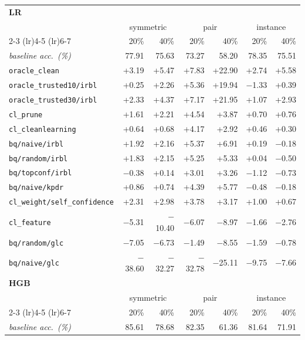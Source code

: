 \begin{tabular}{lrrrrrr}
\toprule
\multicolumn{7}{l}{\textbf{LR}} \\
 & \multicolumn{2}{c}{symmetric} & \multicolumn{2}{c}{pair} & \multicolumn{2}{c}{instance} \\
\cmidrule(lr){2-3} \cmidrule(lr){4-5} \cmidrule(lr){6-7}
 & 20\% & 40\% & 20\% & 40\% & 20\% & 40\% \\
\midrule
\textit{baseline acc.\ (\%)} & 77.91 & 75.63 & 73.27 & 58.20 & 78.35 & 75.51 \\
\addlinespace
\texttt{oracle\_clean} & +3.19 & +5.47 & +7.83 & +22.90 & +2.74 & +5.58 \\
\texttt{oracle\_trusted10/irbl} & +0.25 & +2.26 & +5.36 & +19.94 & $-$1.33 & +0.39 \\
\texttt{oracle\_trusted30/irbl} & +2.33 & +4.37 & +7.17 & +21.95 & +1.07 & +2.93 \\
\texttt{cl\_prune} & +1.61 & +2.21 & +4.54 & +3.87 & +0.70 & +0.76 \\
\texttt{cl\_cleanlearning} & +0.64 & +0.68 & +4.17 & +2.92 & +0.46 & +0.30 \\
\texttt{bq/naive/irbl} & +1.92 & +2.16 & +5.37 & +6.91 & +0.19 & $-$0.18 \\
\texttt{bq/random/irbl} & +1.83 & +2.15 & +5.25 & +5.33 & +0.04 & $-$0.50 \\
\texttt{bq/topconf/irbl} & $-$0.38 & +0.14 & +3.01 & +3.26 & $-$1.12 & $-$0.73 \\
\texttt{bq/naive/kpdr} & +0.86 & +0.74 & +4.39 & +5.77 & $-$0.48 & $-$0.18 \\
\texttt{cl\_weight/self\_confidence} & +2.31 & +2.98 & +3.78 & +3.17 & +1.00 & +0.67 \\
\texttt{cl\_feature} & $-$5.31 & $-$10.40 & $-$6.07 & $-$8.97 & $-$1.66 & $-$2.76 \\
\texttt{bq/random/glc} & $-$7.05 & $-$6.73 & $-$1.49 & $-$8.55 & $-$1.59 & $-$0.78 \\
\texttt{bq/naive/glc} & $-$38.60 & $-$32.27 & $-$32.78 & $-$25.11 & $-$9.75 & $-$7.66 \\
\midrule
\multicolumn{7}{l}{\textbf{HGB}} \\
 & \multicolumn{2}{c}{symmetric} & \multicolumn{2}{c}{pair} & \multicolumn{2}{c}{instance} \\
\cmidrule(lr){2-3} \cmidrule(lr){4-5} \cmidrule(lr){6-7}
 & 20\% & 40\% & 20\% & 40\% & 20\% & 40\% \\
\midrule
\textit{baseline acc.\ (\%)} & 85.61 & 78.68 & 82.35 & 61.36 & 81.64 & 71.91 \\

\end{tabular}

